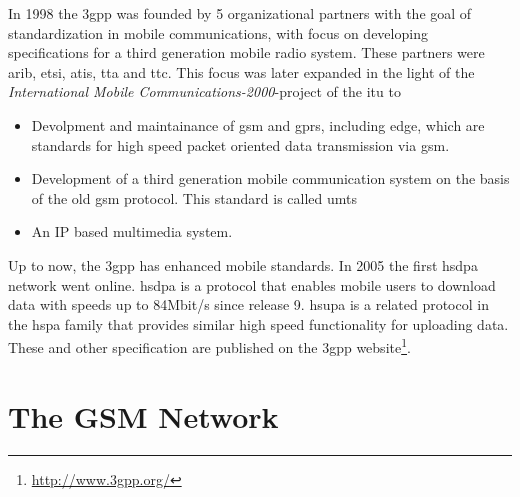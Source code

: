 In 1998 the \gls{3gpp} was founded by 5 organizational partners with the goal of standardization in mobile communications, with focus on developing specifications for a third generation mobile radio system.
These partners were \gls{arib}, \gls{etsi}, \gls{atis}, \gls{tta} and \gls{ttc}.
This focus was later expanded in the light of the \emph{International Mobile Communications-2000}-project \cite{3gpp_Proposal2000} of the \gls{itu} to 
\begin{itemize}
	\item Devolpment and maintainance of \gls{gsm} and \gls{gprs}, including \gls{edge}, which are standards for high speed packet oriented data transmission via \gls{gsm}.
	\item Development of a third generation mobile communication system on the basis of the old \gls{gsm} protocol. This standard is called \gls{umts}
	\item An IP based multimedia system.
\end{itemize}
Up to now, the \gls{3gpp} has enhanced mobile standards.
In 2005 the first \gls{hsdpa} network went online.
\gls{hsdpa} \cite{hsdpa} is a protocol that enables mobile users to download data with speeds up to 84Mbit/s since release 9.
\gls{hsupa} \cite{hsupa} is a related protocol in the \gls{hspa} family that provides similar high speed functionality for uploading data.
These and other specification are published on the \gls{3gpp} website\footnote{\url{http://www.3gpp.org/}}.

\section{The GSM Network}
\label{sec:network}

